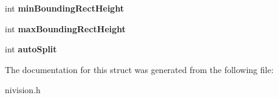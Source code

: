 \begin{DoxyCompactItemize}
\item 
\hypertarget{structOCRSpacingOptions__struct_a6afd08cdaa7068d86eb299f61a95a5b2}{int {\bfseries min\-Bounding\-Rect\-Height}}\label{structOCRSpacingOptions__struct_a6afd08cdaa7068d86eb299f61a95a5b2}

\item 
\hypertarget{structOCRSpacingOptions__struct_ae7f9dfc75bcc5c972792fc86adf41a1f}{int {\bfseries max\-Bounding\-Rect\-Height}}\label{structOCRSpacingOptions__struct_ae7f9dfc75bcc5c972792fc86adf41a1f}

\item 
\hypertarget{structOCRSpacingOptions__struct_a9f296474a7818b6695d55225fc0052d1}{int {\bfseries auto\-Split}}\label{structOCRSpacingOptions__struct_a9f296474a7818b6695d55225fc0052d1}

\end{DoxyCompactItemize}


\-The documentation for this struct was generated from the following file\-:\begin{DoxyCompactItemize}
\item 
nivision.\-h\end{DoxyCompactItemize}
